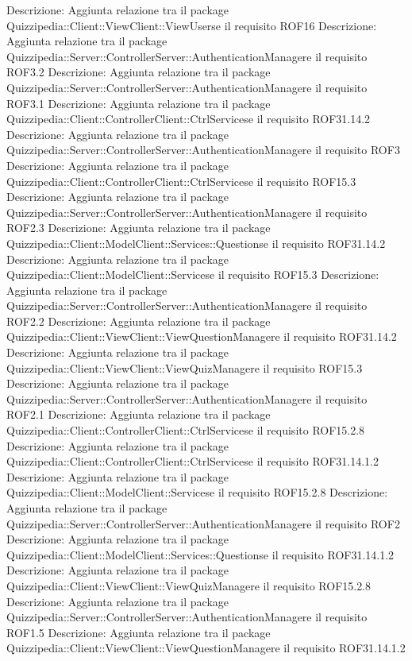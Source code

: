 Descrizione: Aggiunta relazione tra il package Quizzipedia::Client::ViewClient::ViewUserse il requisito ROF16 
Descrizione: Aggiunta relazione tra il package Quizzipedia::Server::ControllerServer::AuthenticationManagere il requisito ROF3.2 
Descrizione: Aggiunta relazione tra il package Quizzipedia::Server::ControllerServer::AuthenticationManagere il requisito ROF3.1 
Descrizione: Aggiunta relazione tra il package Quizzipedia::Client::ControllerClient::CtrlServicese il requisito ROF31.14.2 
Descrizione: Aggiunta relazione tra il package Quizzipedia::Server::ControllerServer::AuthenticationManagere il requisito ROF3 
Descrizione: Aggiunta relazione tra il package Quizzipedia::Client::ControllerClient::CtrlServicese il requisito ROF15.3 
Descrizione: Aggiunta relazione tra il package Quizzipedia::Server::ControllerServer::AuthenticationManagere il requisito ROF2.3 
Descrizione: Aggiunta relazione tra il package Quizzipedia::Client::ModelClient::Services::Questionse il requisito ROF31.14.2 
Descrizione: Aggiunta relazione tra il package Quizzipedia::Client::ModelClient::Servicese il requisito ROF15.3 
Descrizione: Aggiunta relazione tra il package Quizzipedia::Server::ControllerServer::AuthenticationManagere il requisito ROF2.2 
Descrizione: Aggiunta relazione tra il package Quizzipedia::Client::ViewClient::ViewQuestionManagere il requisito ROF31.14.2 
Descrizione: Aggiunta relazione tra il package Quizzipedia::Client::ViewClient::ViewQuizManagere il requisito ROF15.3 
Descrizione: Aggiunta relazione tra il package Quizzipedia::Server::ControllerServer::AuthenticationManagere il requisito ROF2.1 
Descrizione: Aggiunta relazione tra il package Quizzipedia::Client::ControllerClient::CtrlServicese il requisito ROF15.2.8 
Descrizione: Aggiunta relazione tra il package Quizzipedia::Client::ControllerClient::CtrlServicese il requisito ROF31.14.1.2 
Descrizione: Aggiunta relazione tra il package Quizzipedia::Client::ModelClient::Servicese il requisito ROF15.2.8 
Descrizione: Aggiunta relazione tra il package Quizzipedia::Server::ControllerServer::AuthenticationManagere il requisito ROF2 
Descrizione: Aggiunta relazione tra il package Quizzipedia::Client::ModelClient::Services::Questionse il requisito ROF31.14.1.2 
Descrizione: Aggiunta relazione tra il package Quizzipedia::Client::ViewClient::ViewQuizManagere il requisito ROF15.2.8 
Descrizione: Aggiunta relazione tra il package Quizzipedia::Server::ControllerServer::AuthenticationManagere il requisito ROF1.5 
Descrizione: Aggiunta relazione tra il package Quizzipedia::Client::ViewClient::ViewQuestionManagere il requisito ROF31.14.1.2 
